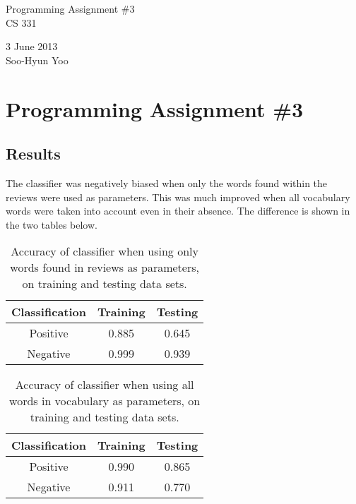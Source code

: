 \documentclass[12pt,letterpaper]{article}
\begin{document}
\begin{titlepage}
	\vspace*{4cm}
	\begin{flushright}
	{\huge
		Programming Assignment \#3 \\ [3cm]
	}
	{\large
		CS 331
	}
	\end{flushright}

	\begin{flushright}
		3 June 2013 \\
		Soo-Hyun Yoo
	\end{flushright}
\end{titlepage}

\section*{Programming Assignment \#3}

\subsection*{Results}

The classifier was negatively biased when only the words found within the
reviews were used as parameters. This was much improved when all vocabulary
words were taken into account even in their absence. The difference is shown in
the two tables below.

\begin{table}[!h]
	\centering
	\begin{tabular}{|c|c|c|} \hline
		Classification & Training & Testing \\ \hline\hline
		Positive       & 0.885    & 0.645   \\ \hline
		Negative       & 0.999    & 0.939   \\ \hline
	\end{tabular}
	\caption{Accuracy of classifier when using only words found in reviews as parameters, on training and testing data sets.}
\end{table}

\begin{table}[!h]
	\centering
	\begin{tabular}{|c|c|c|} \hline
		Classification & Training & Testing \\ \hline\hline
		Positive       & 0.990    & 0.865   \\ \hline
		Negative       & 0.911    & 0.770   \\ \hline
	\end{tabular}
	\caption{Accuracy of classifier when using all words in vocabulary as parameters, on training and testing data sets.}
\end{table}
\end{document}
